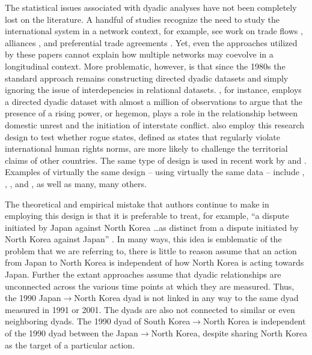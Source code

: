 \documentclass[3p,times,twocolumn,authoryear,12pt]{elsarticle}
\begin{document}
The statistical issues associated with dyadic analyses have not been completely lost on the literature. A handful of studies recognize the need to study the international system in a network context, for example, see work on trade flows \citep{ward:hoff:2007}, alliances \citep{warren:2010}, and preferential trade agreements \citep{manger:etal:2012}. Yet, even the approaches utilized by these papers cannot explain how multiple networks may coevolve in a longitudinal context. More problematic, however, is that since the 1980s the standard approach remains constructing directed dyadic datasets and simply ignoring the issue of interdepencies in relational datasets. \citet{jung:2014}, for instance, employs a directed dyadic dataset with almost a million of observations to argue that the presence of a rising power, or hegemon, plays a role in the relationship between domestic unrest and the initiation of interstate conflict. \citet{mitchell:trumbore:2014} also employ this research design to test whether rogue states, defined as states that regularly violate international human rights norms, are more likely to challenge the territorial claims of other countries. The same type of design is used in recent work by \citet{fuhrmann:sechser:2014} and \citet{weisiger:etal:2015}. Examples of virtually the same design -- using virtually the same data -- include \cite{maoz:abdolali:1989}, \cite{bremer:1992}, \cite{maoz:russett:1993},  and \cite{bremer:cusack:1995}, as well as many, many others. 

The theoretical and empirical mistake that authors continue to make in employing this design is that it is preferable to treat, for example, ``a dispute initiated by Japan against North Korea \ldots as distinct from a dispute initiated by North Korea against Japan'' \cite[p. 924]{fuhrmann:sechser:2014}. In many ways, this idea is emblematic of the problem that we are referring to, there is little to reason assume that an action from Japan to North Korea is independent of how North Korea is acting towards Japan. Further the extant approaches assume that dyadic relationships are unconnected across the various time points at which they are measured. Thus, the 1990 Japan$\rightarrow$North Korea dyad is not linked in any way to the same dyad measured in 1991 or 2001. The dyads are also not connected to similar or even neighboring dyads. The 1990 dyad of South Korea$\rightarrow$North Korea is independent of the 1990 dyad between the Japan$\rightarrow$North Korea, despite sharing North Korea as the target of a particular action.
\end{document}
